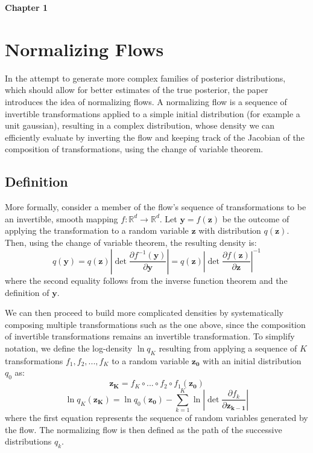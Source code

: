 \begin{center}
	{\Large \bfseries  Chapter 1}
\end{center}

\section*{Normalizing Flows}
In the attempt to generate more complex families of posterior distributions, which should allow for better estimates of the true posterior, the paper introduces the idea of normalizing flows. A normalizing flow is a sequence of invertible transformations applied to a simple initial distribution (for example a unit gaussian), resulting in a complex distribution, whose density we can efficiently evaluate by inverting the flow and keeping track of the Jacobian of the composition of transformations, using the change of variable theorem.

\subsection*{Definition}

More formally, consider a member of the flow's sequence of transformations to be an invertible, smooth mapping $f:\mathbb{R}^d \rightarrow \mathbb{R}^d$. Let $\mathbf{y}=f(\mathbf{z})$ be the outcome of applying the transformation to a random variable $\mathbf{z}$ with distribution $q(\mathbf{z})$. Then, using the change of variable theorem, the resulting density is:
\[ q(\mathbf{y}) = q(\mathbf{z}) \left| \det \frac{\partial f^{-1}(\mathbf{y})}{\partial \mathbf{y}}  \right| = q(\mathbf{z}) \left| \det \frac{\partial f(\mathbf{z})}{\partial \mathbf{z}} \right| ^ {-1} \]
where the second equality follows from the inverse function theorem and the definition of $\mathbf{y}$.

We can then proceed to build more complicated densities by systematically composing multiple transformations such as the one above, since the composition of invertible transformations remains an invertible transformation. To simplify notation, we define the log-density $\ln q_K$ resulting from applying a sequence of $K$ transformations $f_1,f_2,...,f_K$ to a random variable $\mathbf{z_0}$ with an initial distribution $q_0$ as:
\[ \mathbf{z_K} = f_K \circ ... \circ f_2 \circ f_1(\mathbf{z_0}) \]
\[ \ln q_K(\mathbf{z_K}) = \ln q_0(\mathbf{z_0}) - \sum_{k=1}^{K} \ln \left| \det \frac{\partial f_k}{\partial \mathbf{z_{k-1}}} \right|  \]
where the first equation represents the sequence of random variables generated by the flow.  The normalizing flow is then defined as the path of the successive distributions $q_k$. 

